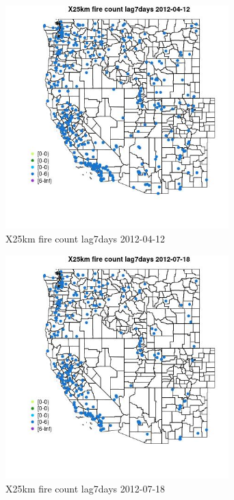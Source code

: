 \begin{figure} 
\centering  
\includegraphics[width=0.77\textwidth]{Code_Outputs/Report_ML_input_PM25_Step4_part_e_de_duplicated_aves_compiled_2019-05-14wNAs_MapObsX25km_fire_count_lag7days2012-04-12.jpg} 
\caption{\label{fig:Report_ML_input_PM25_Step4_part_e_de_duplicated_aves_compiled_2019-05-14wNAsMapObsX25km_fire_count_lag7days2012-04-12}X25km fire count lag7days 2012-04-12} 
\end{figure} 
 

\begin{figure} 
\centering  
\includegraphics[width=0.77\textwidth]{Code_Outputs/Report_ML_input_PM25_Step4_part_e_de_duplicated_aves_compiled_2019-05-14wNAs_MapObsX25km_fire_count_lag7days2012-07-18.jpg} 
\caption{\label{fig:Report_ML_input_PM25_Step4_part_e_de_duplicated_aves_compiled_2019-05-14wNAsMapObsX25km_fire_count_lag7days2012-07-18}X25km fire count lag7days 2012-07-18} 
\end{figure} 
 


